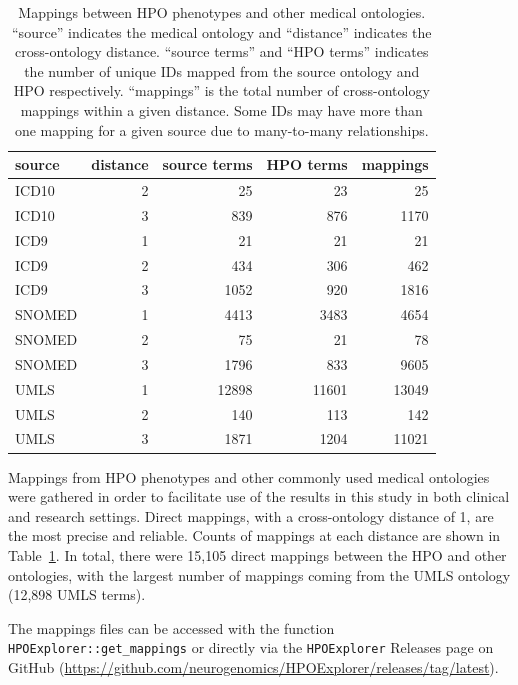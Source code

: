 \documentclass[
]{article}
\begin{document}
\begin{longtable}[]{@{}lrrrr@{}}

\caption{\label{tbl-mappings}Mappings between HPO phenotypes and other
medical ontologies. ``source'' indicates the medical ontology and
``distance'' indicates the cross-ontology distance. ``source terms'' and
``HPO terms'' indicates the number of unique IDs mapped from the source
ontology and HPO respectively. ``mappings'' is the total number of
cross-ontology mappings within a given distance. Some IDs may have more
than one mapping for a given source due to many-to-many relationships.}

\tabularnewline

\toprule\noalign{}
source & distance & source terms & HPO terms & mappings \\
\midrule\noalign{}
\endhead
\bottomrule\noalign{}
\endlastfoot
ICD10 & 2 & 25 & 23 & 25 \\
ICD10 & 3 & 839 & 876 & 1170 \\
ICD9 & 1 & 21 & 21 & 21 \\
ICD9 & 2 & 434 & 306 & 462 \\
ICD9 & 3 & 1052 & 920 & 1816 \\
SNOMED & 1 & 4413 & 3483 & 4654 \\
SNOMED & 2 & 75 & 21 & 78 \\
SNOMED & 3 & 1796 & 833 & 9605 \\
UMLS & 1 & 12898 & 11601 & 13049 \\
UMLS & 2 & 140 & 113 & 142 \\
UMLS & 3 & 1871 & 1204 & 11021 \\

\end{longtable}

Mappings from HPO phenotypes and other commonly used medical ontologies
were gathered in order to facilitate use of the results in this study in
both clinical and research settings. Direct mappings, with a
cross-ontology distance of 1, are the most precise and reliable. Counts
of mappings at each distance are shown in Table~\ref{tbl-mappings}. In
total, there were 15,105 direct mappings between the HPO and other
ontologies, with the largest number of mappings coming from the UMLS
ontology (12,898 UMLS terms).

The mappings files can be accessed with the function
\texttt{HPOExplorer::get\_mappings} or directly via the
\texttt{HPOExplorer} Releases page on GitHub
(\url{https://github.com/neurogenomics/HPOExplorer/releases/tag/latest}).
\end{document}
